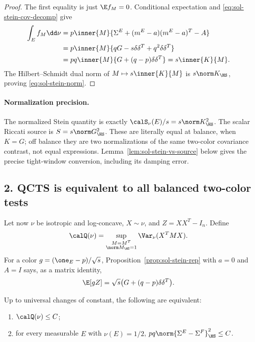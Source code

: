 \documentclass[../main.tex]{subfiles}
\begin{document}
\begin{proof}
The first equality is just $\E f_M=0$.  Conditional expectation and
\eqref{eq:sol-stein-cov-decomp} give
\begin{align*}
 \int_E f_M\dd\nu
 &=p\inner{M}{\Sigma^E+(m^E-a)(m^E-a)^T-A}\\
 &=p\inner{M}{qG-s\delta\delta^T+q^2\delta\delta^T}\\
 &=pq\inner{M}{G+(q-p)\delta\delta^T}
 =s\inner{K}{M}.
\end{align*}
The Hilbert--Schmidt dual norm of $M\mapsto s\inner{K}{M}$ is
$s\norm K_\HS$, proving \eqref{eq:sol-stein-norm}.
\end{proof}

\paragraph{Normalization precision.}
The normalized Stein quantity is exactly $\calS_\nu(E)/s=s\norm K_\HS^2$.  The scalar
Riccati source is $S=s\norm G_\HS^2$.  These are literally equal at balance, when $K=G$;
off balance they are two normalizations of the same two-color covariance contrast, not equal
expressions.  Lemma~\ref{lem:sol-stein-vs-source} below gives the precise tight-window
conversion, including its damping error.

\subsection*{2. QCTS is equivalent to all balanced two-color tests}

Let now $\nu$ be isotropic and log-concave, $X\sim\nu$, and
$Z=XX^T-I_n$.  Define
\[
 \calQ(\nu)=\sup_{\substack{M=M^T\\\norm M_\HS=1}}
 \Var_\nu(X^TMX).
\]
For a color $g=(\one_E-p)/\sqrt{s}$, Proposition~\ref{prop:sol-stein-rep} with $a=0$ and
$A=I$ says, as a matrix identity,
\begin{equation}\label{eq:sol-color-tensor}
 \E[gZ]=\sqrt{s}\bigl(G+(q-p)\delta\delta^T\bigr).
\end{equation}

\begin{proposition}[= Proposition~\ref{prop:qcts-equivalence}]
\label{prop:sol-qcts-equivalence}
Up to universal changes of constant, the following are equivalent:
\begin{enumerate}[label=(\roman*),leftmargin=2.2em]
 \item $\calQ(\nu)\le C$;
 \item for every measurable $E$ with $\nu(E)=1/2$,
 $pq\norm{\Sigma^E-\Sigma^F}_\HS^2\le C$.
\end{enumerate}
\end{proposition}
\end{document}
